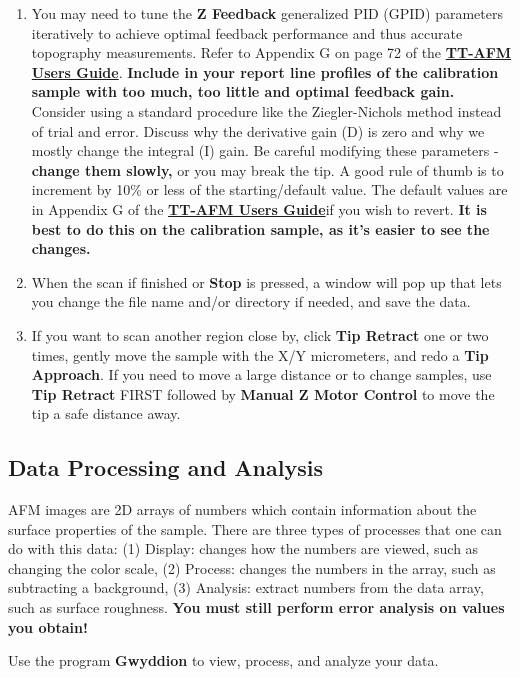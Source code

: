 \documentclass{../lab}
\newcommand{\afmuserguide}{\href{https://berkeley-physics111b.github.io/assets/pdf/oldwebsitestructure/AFMImages/TT_AFM\%20User-Guide-V2.2-600DPI.pdf}{\textbf{TT-AFM Users Guide}}}
\begin{document}
\begin{enumerate}
    \item You may need to tune the \textbf{Z Feedback} generalized PID (GPID) parameters iteratively to achieve optimal feedback performance and thus accurate topography measurements. Refer to Appendix G on page 72 of the \afmuserguide. \textbf{Include in your report line profiles of the calibration sample with too much, too little and optimal feedback gain.} Consider using a standard procedure like the Ziegler-Nichols method instead of trial and error. Discuss why the derivative gain (D) is zero and why we mostly change the integral (I) gain. Be careful modifying these parameters - \textbf{change them slowly,} or you may break the tip. A good rule of thumb is to increment by 10\% or less of the starting/default value. The default values are in Appendix G of the \afmuserguide if you wish to revert. \textbf{It is best to do this on the calibration sample, as it's easier to see the changes.}
    
    \item When the scan if finished or \textbf{Stop} is pressed, a window will pop up that lets you change the file name and/or directory if needed, and save the data.
    
    \item If you want to scan another region close by, click \textbf{Tip Retract} one or two times, gently move the sample with the X/Y micrometers, and redo a \textbf{Tip Approach}. If you need to move a large distance or to change samples, use \textbf{Tip Retract} FIRST followed by \textbf{Manual Z Motor Control} to move the tip a safe distance away. 
\end{enumerate}    
    
\subsection{Data Processing and Analysis}
\label{sec:DataProcessingAndAnalysis}

AFM images are 2D arrays of numbers which contain information about the surface properties of the sample. There are three types of processes that one can do with this data: (1) Display: changes how the numbers are viewed, such as changing the color scale, (2) Process: changes the numbers in the array, such as subtracting a background, (3) Analysis: extract numbers from the data array, such as surface roughness. \textbf{You must still perform error analysis on values you obtain!}


Use the program \textbf{Gwyddion} to view, process, and analyze your data.
\end{document}
